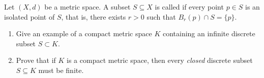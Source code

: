 \begin{exercise}
\label{ex:infinite_discrete_subsets_compact}
Let $(X, d)$ be a metric space. A subset $S \subseteq X$ is called  if every
point $p \in S$ is an isolated point of $S$, that is, there exists $r > 0$ such that
$B_r(p) \cap S = \{p\}$.
\begin{enumerate}[label=\textbf{(\alph*)}]
  \item Give an example of a compact metric space $K$ containing an infinite discrete subset $S \subset K$.
  \item Prove that if $K$ is a compact metric space, then every \emph{closed} discrete subset
    $S \subseteq K$ must be finite.
\end{enumerate}
\end{exercise}
